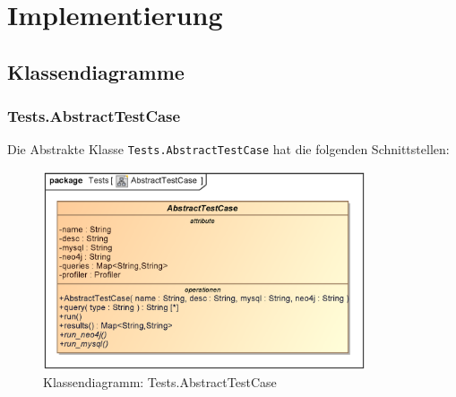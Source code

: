 \section{Implementierung}\label{ch:implementierung}


\subsection{Klassendiagramme}
\subsubsection{Tests.AbstractTestCase}
Die Abstrakte Klasse \verb|Tests.AbstractTestCase| hat die folgenden Schnittstellen:
\begin{figure}[H]
    \myfloatalign
    \includegraphics[width=0.85\textwidth]{gfx/MtGDeepAnalysis/AbstractTestCase.eps}
    \caption{Klassendiagramm: Tests.AbstractTestCase}
    \label{fig:class:tests.abstracttestcase}
\end{figure}
